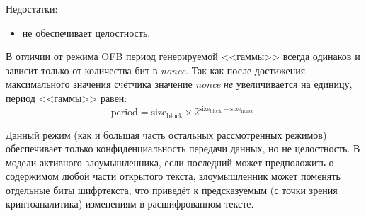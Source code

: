Недостатки:
\begin{itemize}
	\item не обеспечивает целостность.
\end{itemize}

В отличии от режима OFB период генерируемой <<гаммы>> всегда одинаков и зависит только от количества бит в \emph{nonce}. Так как после достижения максимального значения счётчика значение \emph{nonce} \emph{не} увеличивается на единицу, период <<гаммы>> равен:
\[
   \textrm{period} = \textrm{size}_\textrm{block} \times 2^{ \textrm{size}_\textrm{block} - \textrm{size}_\textrm{nonce} }.
\]

Данный режим (как и большая часть остальных рассмотренных режимов) обеспечивает только конфиденциальность передачи данных, но не целостность. В модели активного злоумышленника, если последний может предположить о содержимом любой части открытого текста, злоумышленник может поменять отдельные биты шифртекста, что приведёт к предсказуемым (с точки зрения криптоаналитика) изменениям в расшифрованном тексте.